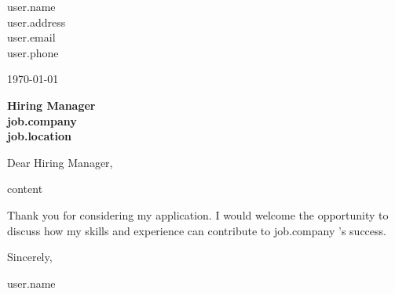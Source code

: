 \documentclass[11pt]{letter}
\begin{document}
\begin{flushright}
{{ user.name }}\\
{{ user.address }}\\
{{ user.email }}\\
{{ user.phone }}
\end{flushright}

\vspace{1cm}

\today

\vspace{1cm}

\textbf{Hiring Manager}\\
\textbf{ {{ job.company }} }\\
\textbf{ {{ job.location }} }

\vspace{1cm}

Dear Hiring Manager,

\vspace{0.5cm}

{{ content }}

\vspace{1cm}

Thank you for considering my application. I would welcome the opportunity to discuss how my skills and experience can contribute to {{ job.company }}'s success.

\vspace{0.5cm}

Sincerely,

\vspace{0.5cm}
{{ user.name }}
\end{document}
